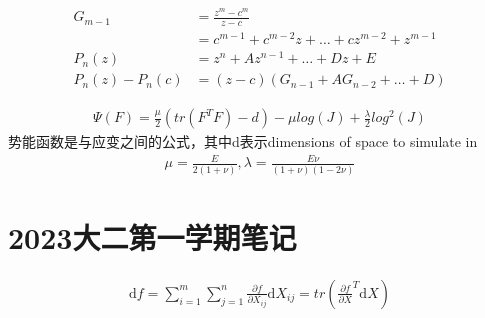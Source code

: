 \begin{thm}[代数基本定理的证明]
		\begin{align*}
				G_{m-1}&= \frac{z^m - c^m}{z-c} \\
					   &=c^{m-1}+c^{m-2}z+\ldots+cz^{m-2}+z^{m-1}  \\
				P_n(z) &= z^n + Az^{n-1} + \ldots+Dz + E\\
				P_n(z) - P_n(c) &= (z-c)(G_{n-1}+AG_{n-2}+\ldots+D)
		\end{align*}
\end{thm}
\begin{thm}
		\begin{align*}
		\Psi(F) = \frac{\mu}{2} (tr(F^TF)-d)  - \mu log(J) + \frac{\lambda}{2}  log^2(J)
		\end{align*}
		势能函数是与应变之间的公式，其中d表示dimensions of space to simulate in 
\begin{align*}
		\mu  = \frac{E}{2(1+\nu )} , \lambda = \frac{E\nu }{(1+\nu )(1-2\nu )} 
\end{align*}
\end{thm}
\section{2023大二第一学期笔记}
\begin{thm}[矩阵内积以表示矩阵微分]
		\begin{align*}
				\mathrm{d}f = \sum_{i=1}^{m} \sum_{j=1}^{n} \frac{\partial f}{\partial X_{ij}} \mathrm{d}X_{ij}=tr(\frac{\partial f}{\partial X} ^T \mathrm{d}X)
		\end{align*}
\end{thm}

